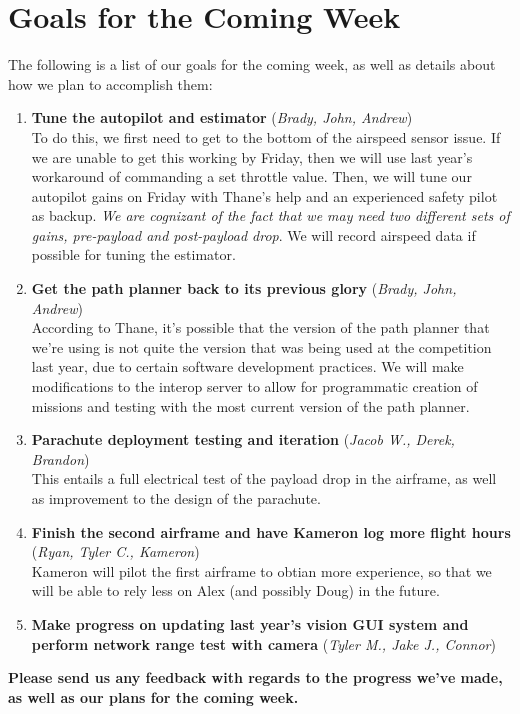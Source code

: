 \documentclass[]{../auvsi_doc}
\begin{document}
\section{Goals for the Coming Week}

The following is a list of our goals for the coming week, as well as details about how we plan to accomplish them:

\begin{enumerate}
\item \textbf{Tune the autopilot and estimator} (\textit{Brady, John, Andrew}) \\
To do this, we first need to get to the bottom of the airspeed sensor issue. If we are unable to get this working by Friday, then we will use last year's workaround of commanding a set throttle value. Then, we will tune our autopilot gains on Friday with Thane's help and an experienced safety pilot as backup. \textit{We are cognizant of the fact that we may need two different sets of gains, pre-payload and post-payload drop}. We will record airspeed data if possible for tuning the estimator.

\item \textbf{Get the path planner back to its previous glory} (\textit{Brady, John, Andrew}) \\
According to Thane, it's possible that the version of the path planner that we're using is not quite the version that was being used at the competition last year, due to certain software development practices. We will make modifications to the interop server to allow for programmatic creation of missions and testing with the most current version of the path planner.
\item \textbf{Parachute deployment testing and iteration} (\textit{Jacob W., Derek, Brandon}) \\
This entails a full electrical test of the payload drop in the airframe, as well as improvement to the design of the parachute.
\item \textbf{Finish the second airframe and have Kameron log more flight hours} (\textit{Ryan, Tyler C., Kameron}) \\
Kameron will pilot the first airframe to obtian more experience, so that we will be able to rely less on Alex (and possibly Doug) in the future.
\item \textbf{Make progress on updating last year's vision GUI system and perform network range test with camera} (\textit{Tyler M., Jake J., Connor}) \\
\end{enumerate}
\textbf{Please send us any feedback with regards to the progress we've made, as well as our plans for the coming week.}

%
%
%
\end{document}
